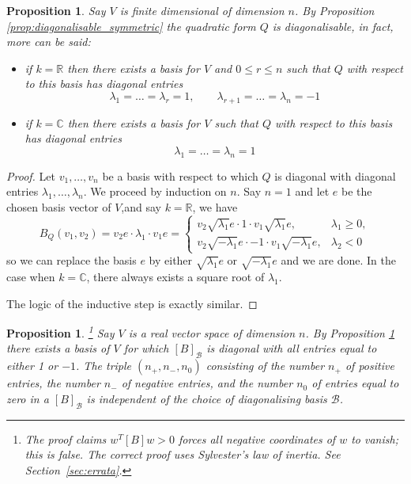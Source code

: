 \documentclass[12pt]{article}
\theoremstyle{plain}
\newtheorem{proposition}[thm]{Proposition}
\theoremstyle{definition}
\newcommand{\bb}[1]{\mathbb{#1}}
\newcommand{\scr}[1]{\mathscr{#1}}
\begin{document}
\begin{proposition}\label{prop:one_negative_one}
Say $V$ is finite dimensional of dimension $n$. By Proposition \ref{prop:diagonalisable_symmetric} the quadratic form $Q$ is diagonalisable, in fact, more can be said:
\begin{itemize}
\item if $k = \bb{R}$ then there exists a basis for $V$ and $0 \leq r \leq n$ such that $Q$ with respect to this basis has diagonal entries
\begin{equation}
\lambda_1 = \hdots = \lambda_r = 1, \qquad \lambda_{r+1} = \hdots = \lambda_n = -1
\end{equation}
\item if $k = \bb{C}$ then there exists a basis for $V$ such that $Q$ with respect to this basis has diagonal entries
\begin{equation}
\lambda_1 = \hdots = \lambda_n = 1
\end{equation}
\end{itemize}
\end{proposition}
\begin{proof}
Let $v_1,\hdots,v_n$ be a basis with respect to which $Q$ is diagonal with diagonal entries $\lambda_1,\hdots,\lambda_n$. We proceed by induction on $n$. Say $n = 1$ and let $e$ be the chosen basis vector of $V$,and say $k = \bb{R}$,  we have
\begin{equation}
B_Q(v_1,v_2) = v_2e\cdot \lambda_1 \cdot v_1 e =
\begin{cases}
v_2 \sqrt{\lambda_1}e\cdot 1 \cdot v_1\sqrt{\lambda_1} e,&\lambda_1 \geq 0,\\
v_2 \sqrt{-\lambda_1}e\cdot -1 \cdot v_1\sqrt{-\lambda_1} e,& \lambda_2 < 0
\end{cases}
\end{equation}
so we can replace the basis $e$ by either $\sqrt{\lambda_1}e$ or $\sqrt{-\lambda_1}e$ and we are done. In the case when $k = \bb{C}$, there always exists a square root of $\lambda_1$.

The logic of the inductive step is exactly similar.
\end{proof}
\begin{proposition}\label{prop:signature}\footnote{The proof claims $w^T[B]w>0$ forces all negative coordinates of $w$ to vanish; this is false. The correct proof uses Sylvester's law of inertia. See Section~\ref{sec:errata}.}
Say $V$ is a real vector space of dimension $n$. By Proposition \ref{prop:one_negative_one} there exists a basis of $V$ for which $[B]_{\scr{B}}$ is diagonal with all entries equal to either 1 or $-1$. The triple $(n_{+},n_{-},n_0)$ consisting of the number $n_{+}$ of positive entries, the number $n_{-}$ of negative entries, and the number $n_{0}$ of entries equal to zero in a $[B]_{\scr{B}}$ is independent of the choice of diagonalising basis $\scr{B}$. 
\end{proposition}
\end{document}
